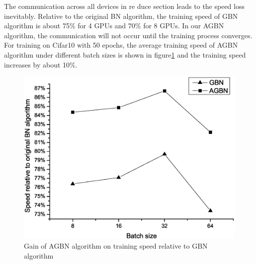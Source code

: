 

The communication across all devices in re duce section leads to the speed loss inevitably. Relative to the original BN algorithm, the training speed of GBN algorithm is about 75\% for 4 GPUs and 70\% for 8 GPUs. In our AGBN algorithm, the communication will not occur until the training process converges. For training on Cifar10 with 50 epochs, the average training speed of AGBN algorithm under different batch sizes is shown in figure\ref{fig:speedVsBz} and the training speed increases by about 10\%.
\begin{figure}
\centering
\includegraphics[width=0.8\linewidth]{figure/speedVsBz.eps}
\caption{Gain of AGBN algorithm on training speed relative to GBN algorithm}
\label{fig:speedVsBz}
\end{figure}



